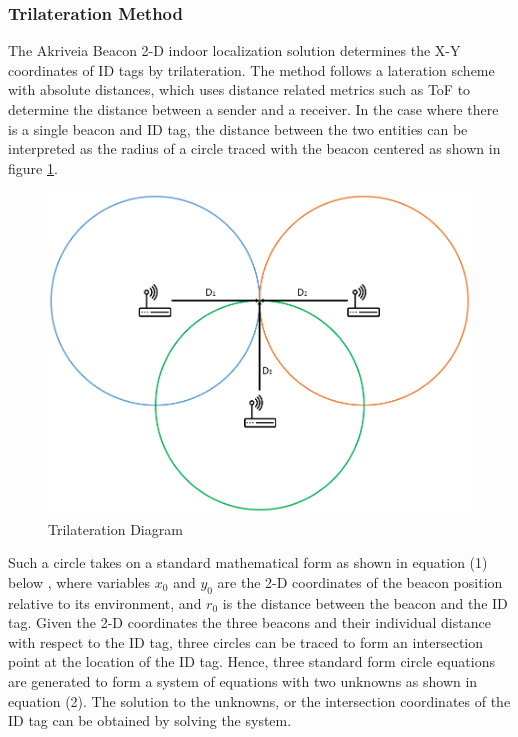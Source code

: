 \pagebreak
\subsubsection{Trilateration Method}
\medskip
The Akriveia Beacon 2-D indoor localization solution determines the X-Y coordinates of ID tags by trilateration. The method follows a lateration scheme with absolute distances, which uses distance related metrics such as ToF to determine the distance between a sender and a receiver. In the case where there is a single beacon and ID tag, the distance between the two entities can be interpreted as the radius of a circle traced with the beacon centered as shown in figure \ref{tri}. 

\medskip
\begin{figure}[H]
\centering
    \includegraphics[scale=0.55]{./images/Tri.png}
    \caption{Trilateration Diagram}
    \label{tri}
\end{figure}


\medskip
Such a circle takes on a standard mathematical form as shown in equation (1) below \cite{R2-1-2-1}, where variables $x_0$ and $y_0$ are the 2-D coordinates of the beacon position relative to its environment, and $r_0$ is the distance between the beacon and the ID tag. Given the 2-D coordinates the three beacons and their individual distance with respect to the ID tag, three circles can be traced to form an intersection point at the location of the ID tag. Hence, three standard form circle equations are generated to form a system of equations with two unknowns as shown in equation (2). The solution to the unknowns, or the intersection coordinates of the ID tag can be obtained by solving the system.


